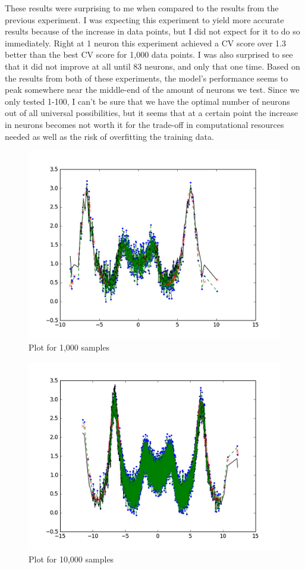 \documentclass[11pt]{article}
\begin{document}
These results were surprising to me when compared to the results from the previous experiment. I was expecting this experiment to yield more accurate results because of the increase in data points, but I did not expect for it to do so immediately. Right at 1 neuron this experiment achieved a CV score over 1.3 better than the best CV score for 1,000 data points. I was also surprised to see that it did not improve at all until 83 neurons, and only that one time. Based on the results from both of these experiments, the model's performance seems to peak somewhere near the middle-end of the amount of neurons we test. Since we only tested 1-100, I can't be sure that we have the optimal number of neurons out of all universal possibilities, but it seems that at a certain point the increase in neurons becomes not worth it for the trade-off in computational resources needed as well as the risk of overfitting the training data.

\begin{figure}[!htb]
\centering
	\includegraphics{NeuronGraph.png}
	\caption{Plot for 1,000 samples}
\end{figure}

\begin{figure}[!htb]
\centering
	\includegraphics{NeuronGraph2.png}
	\caption{Plot for 10,000 samples}
\end{figure}
\end{document}
